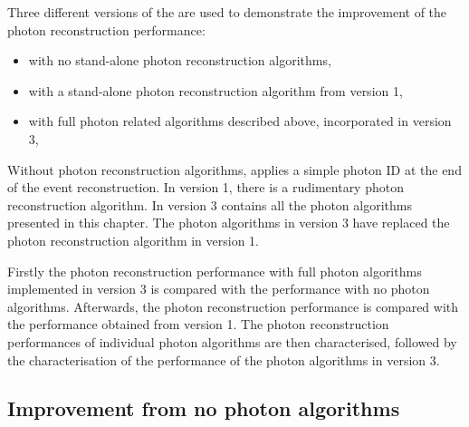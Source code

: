 
Three different versions of the \pandora are used to demonstrate the improvement of  the photon reconstruction performance:
\begin{itemize}
  \item with no stand-alone photon reconstruction algorithms,
  \item with a stand-alone photon reconstruction algorithm from \pandora version 1,
  \item with full photon related algorithms described above, incorporated in \pandora version 3,
\end{itemize}

Without photon reconstruction algorithms, \pandora applies a simple photon ID at the end of the event reconstruction. In \pandora version 1, there is a rudimentary photon reconstruction algorithm. In \pandora version 3 contains all the photon algorithms presented in this chapter. The photon algorithms in \pandora version 3 have replaced the   photon reconstruction algorithm in \pandora version 1.


Firstly the photon reconstruction performance with full photon algorithms implemented in \pandora version 3 is compared with the performance with no photon algorithms. Afterwards, the photon reconstruction performance  is compared with the performance obtained from  \pandora version 1. The photon reconstruction performances of individual photon algorithms are then characterised, followed by the characterisation of the performance of the photon algorithms in \pandora version 3.

\subsection{Improvement from no photon algorithms}

